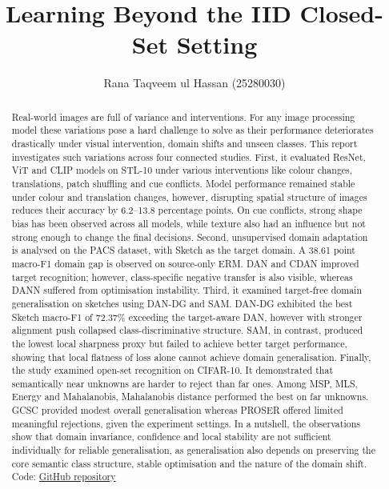\documentclass{article}
\title{Learning Beyond the IID Closed-Set Setting}
\author{Rana Taqveem ul Hassan (25280030)}
\begin{document}
\maketitle

\begin{abstract}
Real-world images are full of variance and interventions. For any image processing model these variations pose a hard challenge to solve as their performance deteriorates drastically under visual intervention, domain shifts and unseen classes. This report investigates such variations across four connected studies. First, it evaluated ResNet, ViT and CLIP models on STL-10 under various interventions like colour changes, translations, patch shuffling and cue conflicts. Model performance remained stable under colour and translation changes, however, disrupting spatial structure of images reduces their accuracy by 6.2--13.8 percentage points.
On cue conflicts, strong shape bias has been observed across all models, while texture also had an influence but not strong enough to change the final decisions. Second, unsupervised domain adaptation is analysed on the PACS dataset, with Sketch as the target domain. A 38.61 point macro-F1 domain gap is observed on source-only ERM. DAN and CDAN improved target recognition; however, class-specific negative transfer is also visible, whereas DANN suffered from optimisation instability. Third, it examined target-free domain generalisation on sketches using DAN-DG and SAM. DAN-DG exhibited the best Sketch macro-F1 of 72.37\% exceeding the target-aware DAN, however with stronger alignment push collapsed class-discriminative structure. SAM, in contrast, produced the lowest local sharpness proxy but failed to achieve better target performance, showing that local flatness of loss alone cannot achieve domain generalisation. Finally, the study examined open-set recognition on CIFAR-10. It demonstrated that semantically near unknowns are harder to reject than far ones. Among MSP, MLS, Energy and Mahalanobis, Mahalanobis distance performed the best on far unknowns. GCSC provided modest overall generalisation whereas PROSER offered limited meaningful rejections, given the experiment settings. In a nutshell, the observations show that domain invariance, confidence and local stability are not sufficient individually for reliable generalisation, as generalisation also depends on preserving the core semantic class structure, stable optimisation and the nature of the domain shift.
Code: \href{https://github.com/rana-taqveem/atml/tree/main/src/assignment_01}{GitHub repository}
\end{abstract}
\end{document}
